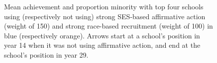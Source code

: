 \begin{figure}
  \centering
  \caption{Mean achievement and proportion minority with top four schools using (respectively not using) strong SES-based affirmative action (weight of 150) and strong race-based recruitment (weight of 100) in \colorbox{sns-blue}{blue} (respectively \colorbox{sns-orange}{orange}). 
  Arrows start at a school's position in year 14 when it was not using affirmative action, and end at the school's position in year 29.}
  \label{fig:3a}
\end{figure}

